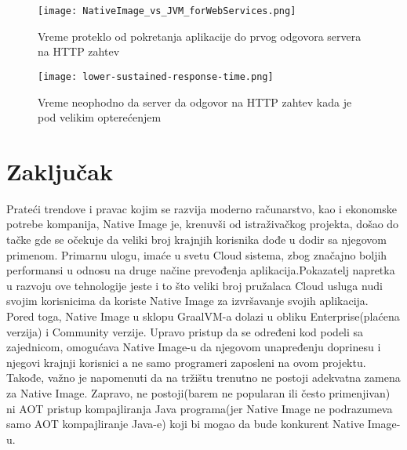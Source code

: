\documentclass[a4paper]{article}
\begin{document}
\begin{figure}[h!]
\begin{center}
\texttt{[image: NativeImage\_vs\_JVM\_forWebServices.png]}
\end{center}
\caption{Vreme proteklo od pokretanja aplikacije do prvog odgovora servera na HTTP zahtev}
\label{fig:vremeDoPrvogOdgovora}
\end{figure}


\begin{figure}[h!]
\begin{center}
\texttt{[image: lower-sustained-response-time.png]}
\end{center}
\caption{Vreme neophodno da server da odgovor na HTTP zahtev kada je pod velikim opterećenjem}
\label{fig:vremePodOpterecenjem}
\end{figure}


\newpage
\section{Zaključak}
Prateći trendove i pravac kojim se razvija moderno računarstvo, kao i ekonomske potrebe kompanija, Native Image je, krenuvši od istraživačkog projekta, došao do tačke gde se očekuje da veliki broj krajnjih korisnika dođe u dodir sa njegovom primenom. Primarnu ulogu, imaće u svetu Cloud sistema, zbog značajno boljih performansi u odnosu na druge načine prevođenja aplikacija.Pokazatelj napretka u razvoju ove tehnologije
jeste i to što veliki broj pružalaca Cloud usluga nudi svojim korisnicima da koriste Native Image za izvršavanje svojih aplikacija. \\
\indent Pored toga, Native Image u sklopu GraalVM-a dolazi u obliku Enterprise(plaćena verzija) i Community verzije. Upravo pristup da se određeni kod podeli sa zajednicom, omogućava Native Image-u da njegovom unapređenju doprinesu i njegovi krajnji korisnici a ne samo programeri zaposleni na ovom projektu. \\ 
\indent Takođe, važno je napomenuti da na tržištu trenutno ne postoji adekvatna zamena za Native Image. Zapravo, ne postoji(barem ne popularan ili često primenjivan) ni AOT pristup kompajliranja Java programa(jer Native Image ne podrazumeva samo AOT kompajliranje Java-e) koji bi mogao da bude konkurent Native Image-u. 
\end{document}
